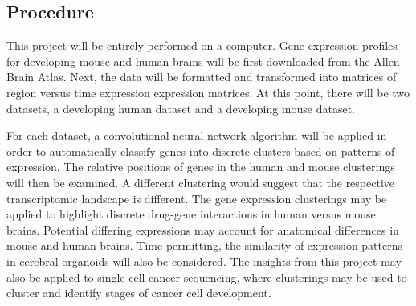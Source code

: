 \documentclass[12pt,oneside,onecolumn,a4paper]{article}
\begin{document}
\subsection{Procedure}
This project will be entirely performed on a computer. Gene expression profiles for developing mouse and human brains will be first downloaded from the Allen Brain Atlas. Next, the data will be formatted and transformed into matrices of region versus time expression expression matrices. At this point, there will be two datasets, a developing human dataset and a developing mouse dataset. 


For each dataset, a convolutional neural network algorithm will be applied in order to automatically classify genes into discrete clusters based on patterns of expression. The relative positions of genes in the human and mouse clusterings will then be examined. A different clustering would suggest that the respective transcriptomic landscape is different. The gene expression clusterings may be applied to highlight discrete drug-gene interactions in human versus mouse brains. Potential differing expressions may account for anatomical differences in mouse and human brains. Time permitting, the similarity of expression patterns in cerebral organoids will also be considered. The insights from this project may also be applied to single-cell cancer sequencing, where clusterings may be used to cluster and identify stages of cancer cell development.



\end{document}

